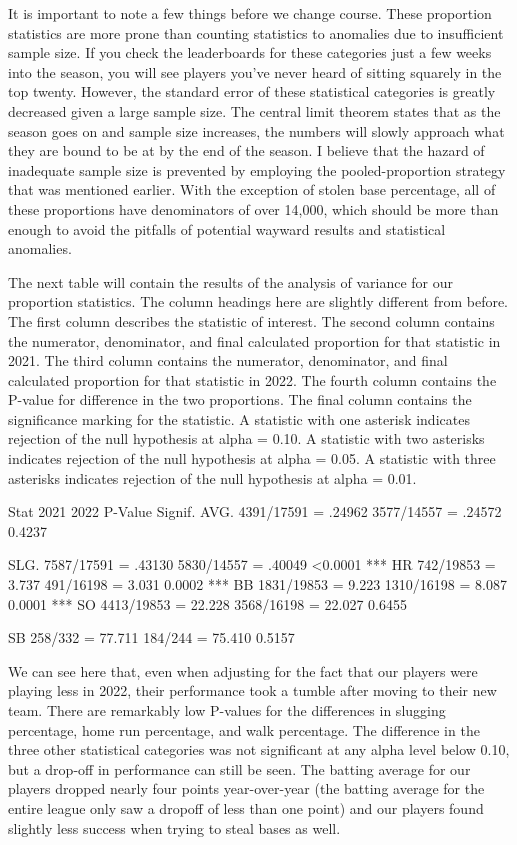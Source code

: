\documentclass[10pt]{article}
\begin{document}
It is important to note a few things before we change course. These proportion statistics are more prone than counting 
statistics to anomalies due to insufficient sample size. If you check the leaderboards for these categories just a few weeks 
into the season, you will see players you’ve never heard of sitting squarely in the top twenty. However, the standard error of 
these statistical categories is greatly decreased given a large sample size. The central limit theorem states that as the 
season goes on and sample size increases, the numbers will slowly approach what they are bound to be at by the end of the 
season. I believe that the hazard of inadequate sample size is prevented by employing the pooled-proportion strategy that was 
mentioned earlier. With the exception of stolen base percentage, all of these proportions have denominators of over 14,000, 
which should be more than enough to avoid the pitfalls of potential wayward results and statistical anomalies.

The next table will contain the results of the analysis of variance for our proportion statistics. The column headings here 
are slightly different from before. The first column describes the statistic of interest. The second column contains the 
numerator, denominator, and final calculated proportion for that statistic in 2021. The third column contains the numerator, 
denominator, and final calculated proportion for that statistic in 2022. The fourth column contains the P-value for difference 
in the two proportions. The final column contains the significance marking for the statistic. A statistic with one asterisk 
indicates rejection of the null hypothesis at alpha = 0.10. A statistic with two asterisks indicates rejection of the null 
hypothesis at alpha = 0.05. A statistic with three asterisks indicates rejection of the null hypothesis at alpha = 0.01.

Stat
2021
2022
P-Value
Signif.
AVG.
4391/17591 = .24962
3577/14557 = .24572
0.4237


SLG.
7587/17591 = .43130
5830/14557 = .40049
<0.0001
***
HR%
742/19853 = 3.737%
491/16198 = 3.031%
0.0002
***
BB%
1831/19853 = 9.223%
1310/16198 = 8.087%
0.0001
***
SO%
4413/19853 = 22.228%
3568/16198 = 22.027%
0.6455


SB%
258/332 = 77.711%
184/244 = 75.410%
0.5157




We can see here that, even when adjusting for the fact that our players were playing less in 2022, their performance took a tumble after moving to their new team. There are remarkably low P-values for the differences in slugging percentage, home run percentage, and walk percentage. The difference in the three other statistical categories was not significant at any alpha level below 0.10, but a drop-off in performance can still be seen. The batting average for our players dropped nearly four points year-over-year (the batting average for the entire league only saw a dropoff of less than one point) and our players found slightly less success when trying to steal bases as well.
\end{document}
